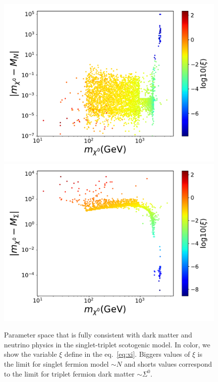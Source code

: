 \documentclass[12pt,letterpaper]{article}
\begin{document}
\begin{figure}
\begin{center}
\includegraphics[scale=0.43]{mxoMN_with_neutrino_physics}
\includegraphics[scale=0.43]{mxoMTF_with_neutrino_physics}
\caption{Parameter space that is fully consistent with dark matter and neutrino physics in the singlet-triplet scotogenic model. In color, we show the variable $\xi$ define in the eq.~\ref{eq:xi}. Biggers values of $\xi$ is the limit for singlet fermion model $\sim N$ and shorts values correspond to the limit for triplet fermion dark matter $\sim \Sigma^0$.}
\label{fig:MN-and-MTF}
\end{center}
\end{figure}
%
\end{document}
